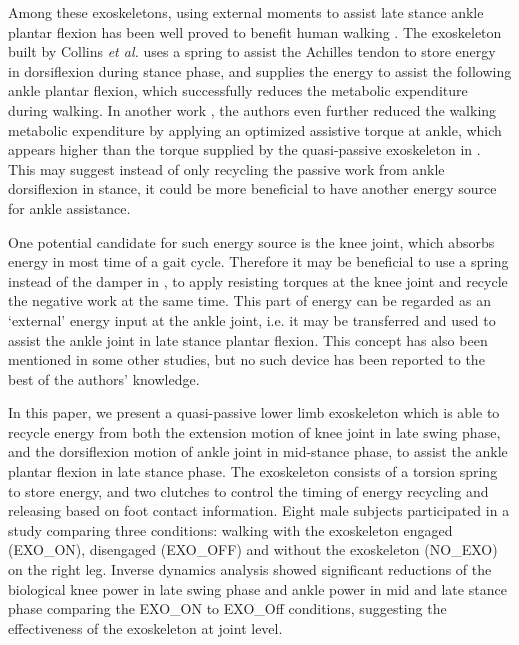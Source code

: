 \documentclass[10pt]{asme2ej}
\begin{document}
Among these exoskeletons, using external moments to assist late stance ankle plantar flexion has been well proved to benefit human walking \cite{RN5,RN9,RN10,RN11,RN12,liu2019ankle}.
The exoskeleton built by Collins \emph{et al.}\cite{RN5} uses a spring to assist the Achilles tendon to store energy in dorsiflexion during stance phase, and supplies the energy to assist the following ankle plantar flexion, which successfully reduces the metabolic expenditure during walking.
In another work \cite{zhang2017human}, the authors even further reduced the walking metabolic expenditure by applying an optimized assistive torque at ankle, which appears higher than the torque supplied by the quasi-passive exoskeleton in \cite{RN5}.
This may suggest instead of only recycling the passive work from ankle dorsiflexion in stance, it could be more beneficial to have another energy source for ankle assistance.

One potential candidate for such energy source is the knee joint, which absorbs energy in most time of a gait cycle\cite{RN2}.
Therefore it may be beneficial to use a spring instead of the damper in \cite{RN3}, to apply resisting torques at the knee joint and recycle the negative work at the same time.
This part of energy can be regarded as an ‘external’ energy input at the ankle joint, i.e. it may be transferred and used to assist the ankle joint in late stance plantar flexion.
This concept has also been mentioned in some other studies\cite{RN3,RN12}, but no such device has been reported to the best of the authors' knowledge.

In this paper, we present a quasi-passive lower limb exoskeleton which is able to recycle energy from both the extension motion of knee joint in late swing phase, and the dorsiflexion motion of ankle joint in mid-stance phase, to assist the ankle plantar flexion in late stance phase.
The exoskeleton consists of a torsion spring to store energy, and two clutches to control the timing of energy recycling and releasing based on foot contact information.
Eight male subjects participated in a study comparing three conditions: walking with the exoskeleton engaged (EXO\_ON), disengaged (EXO\_OFF) and without the exoskeleton (NO\_EXO) on the right leg.
Inverse dynamics analysis showed significant reductions of the biological knee power in late swing phase and ankle power in mid and late stance phase comparing the EXO\_ON to EXO\_Off conditions, suggesting the effectiveness of the exoskeleton at joint level.
\end{document}

